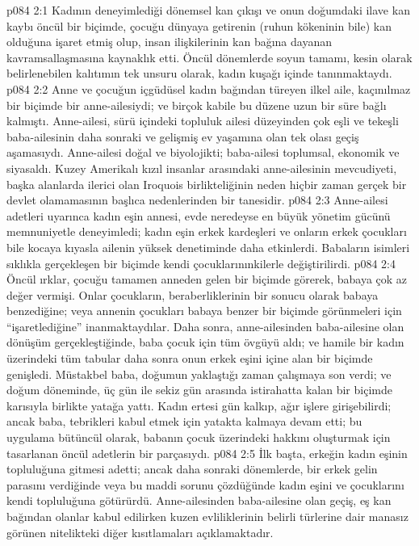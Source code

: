 \vs p084 2:1 Kadının deneyimlediği dönemsel kan çıkışı ve onun doğumdaki ilave kan kaybı öncül bir biçimde, çocuğu dünyaya getirenin (ruhun kökeninin bile) kan olduğuna işaret etmiş olup, insan ilişkilerinin kan bağına dayanan kavramsallaşmasına kaynaklık etti. Öncül dönemlerde soyun tamamı, kesin olarak belirlenebilen kalıtımın tek unsuru olarak, kadın kuşağı içinde tanınmaktaydı.
\vs p084 2:2 Anne ve çocuğun içgüdüsel kadın bağından türeyen ilkel aile, kaçınılmaz bir biçimde bir anne\hyp{}ailesiydi; ve birçok kabile bu düzene uzun bir süre bağlı kalmıştı. Anne\hyp{}ailesi, sürü içindeki topluluk ailesi düzeyinden çok eşli ve tekeşli baba\hyp{}ailesinin daha sonraki ve gelişmiş ev yaşamına olan tek olası geçiş aşamasıydı. Anne\hyp{}ailesi doğal ve biyolojikti; baba\hyp{}ailesi toplumsal, ekonomik ve siyasaldı. Kuzey Amerikalı kızıl insanlar arasındaki anne\hyp{}ailesinin mevcudiyeti, başka alanlarda ilerici olan Iroquois birlikteliğinin neden hiçbir zaman gerçek bir devlet olamamasının başlıca nedenlerinden bir tanesidir.
\vs p084 2:3 Anne\hyp{}ailesi adetleri uyarınca kadın eşin annesi, evde neredeyse en büyük yönetim gücünü memnuniyetle deneyimledi; kadın eşin erkek kardeşleri ve onların erkek çocukları bile kocaya kıyasla ailenin yüksek denetiminde daha etkinlerdi. Babaların isimleri sıklıkla gerçekleşen bir biçimde kendi çocuklarınınkilerle değiştirilirdi.
\vs p084 2:4 Öncül ırklar, çocuğu tamamen anneden gelen bir biçimde görerek, babaya çok az değer vermişi. Onlar çocukların, beraberliklerinin bir sonucu olarak babaya benzediğine; veya annenin çocukları babaya benzer bir biçimde görünmeleri için “işaretlediğine” inanmaktaydılar. Daha sonra, anne\hyp{}ailesinden baba\hyp{}ailesine olan dönüşüm gerçekleştiğinde, baba çocuk için tüm övgüyü aldı; ve hamile bir kadın üzerindeki tüm tabular daha sonra onun erkek eşini içine alan bir biçimde genişledi. Müstakbel baba, doğumun yaklaştığı zaman çalışmaya son verdi; ve doğum döneminde, üç gün ile sekiz gün arasında istirahatta kalan bir biçimde karısıyla birlikte yatağa yattı. Kadın ertesi gün kalkıp, ağır işlere girişebilirdi; ancak baba, tebrikleri kabul etmek için yatakta kalmaya devam etti; bu uygulama bütüncül olarak, babanın çocuk üzerindeki hakkını oluşturmak için tasarlanan öncül adetlerin bir parçasıydı.
\vs p084 2:5 İlk başta, erkeğin kadın eşinin topluluğuna gitmesi adetti; ancak daha sonraki dönemlerde, bir erkek gelin parasını verdiğinde veya bu maddi sorunu çözdüğünde kadın eşini ve çocuklarını kendi topluluğuna götürürdü. Anne\hyp{}ailesinden baba\hyp{}ailesine olan geçiş, eş kan bağından olanlar kabul edilirken kuzen evliliklerinin belirli türlerine dair manasız görünen nitelikteki diğer kısıtlamaları açıklamaktadır.
